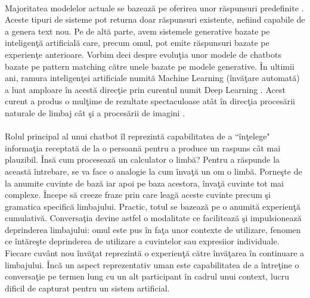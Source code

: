 \paragraph{}
Majoritatea modelelor actuale se bazeaz\u a pe oferirea unor r\u aspunsuri predefinite \cite{chatbot-models}. Aceste tipuri de sisteme pot returna doar r\u aspunsuri existente, nefiind capabile de a genera text nou. Pe de alt\u a parte, avem sistemele generative bazate pe inteligen\c t\u a artificial\u a \cite{chatbot-models} care, precum omul, pot emite r\u aspunsuri bazate pe experien\c te anterioare. Vorbim deci despre evolu\c tia unor modele de chatbots bazate pe pattern matching c\u atre unele bazate pe modele generative. \^ In ultimii ani, ramura inteligen\c tei artificiale numit\u a Machine Learning  (\^ inv\u a\c tare automat\u a) a luat amploare \^ in acest\u a direc\c tie prin curentul numit Deep Learning \cite{Goodfellow-et-al-2016}. Acest curent a produs o mul\c time de rezultate spectaculoase at\^ at \^ in direc\c tia proces\u arii naturale de limbaj c\^ at \c si a proces\u arii de imagini \cite{deep-learning-advancements}.

\paragraph{}
Rolul principal al unui chatbot \^ il reprezint\u a capabilitatea de a ``\^ in\c telege" informa\c tia receptat\u a de la o persoan\u a pentru a produce un raspuns c\^ at mai plauzibil. \^ Ins\u a cum proceseaz\u a un calculator o limb\u a? Pentru a r\u aspunde la aceast\u a \^ intrebare, se va face o analogie la cum \^ inva\c t\u a un om o limb\u a. Porne\c ste de la anumite cuvinte de baz\u a iar apoi pe baza acestora, \^ inva\c t\u a cuvinte tot mai complexe. \^ Incepe s\u a creeze fraze prin care leag\u a aceste cuvinte precum \c si gramatica specific\u a limbajului. Practic, totul se bazeaz\u a pe o anumit\u a experien\c t\u a cumulativ\u a. Conversa\c tia devine astfel o modalitate ce faciliteaz\u a \c si impulsioneaz\u a deprinderea limbajului: omul este pus \^ in fa\c ta unor contexte de utilizare, fenomen ce \^ int\u are\c ste deprinderea de utilizare a cuvintelor sau expresiior individuale. Fiecare cuv\^ ant nou \^ inv\u a\c tat reprezint\u a o experien\c t\u a c\u atre \^ inv\u a\c tarea \^ in continuare a limbajului. \^ Inc\u a un aspect reprezentativ uman este capabilitatea de a \^ intre\c tine o conversa\c tie pe termen lung cu un alt participant \^ in cadrul unui context, lucru dificil de capturat pentru un sistem artificial.

